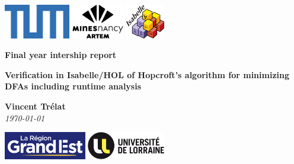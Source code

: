 \documentclass[12pt, a4 paper]{article}
\theoremstyle{definition}
\begin{document}
\begin{titlepage}
    \begin{center}
        \vfill
        \includegraphics[height=1.5cm]{img/logoTUM.png}
        \hfill
        \includegraphics[height=1.5cm]{img/logoartem.png}
        \hfill
        \includegraphics[height=1.5cm]{img/logoisabelle.png}
        \vfill
    \end{center}
    \begin{center}
        
        \textbf{Final year intership report}
        \vfill

        \large{\textbf{Verification in Isabelle/HOL of Hopcroft's algorithm for minimizing DFAs including runtime analysis}}
    \end{center}
    
    \vfill
    
    \begin{center}
        \textbf{Vincent Trélat}\\
        \vspace{1cm}
        \textit{\today}
    \end{center}
    \vfill
    \begin{center}
        \includegraphics[height=1.2cm]{img/logoGE.png}
        \hfill
        \includegraphics[height=1.2cm]{img/logoUL.png}
    \end{center}
\end{titlepage}

\tableofcontents

\pagebreak
\end{document}
